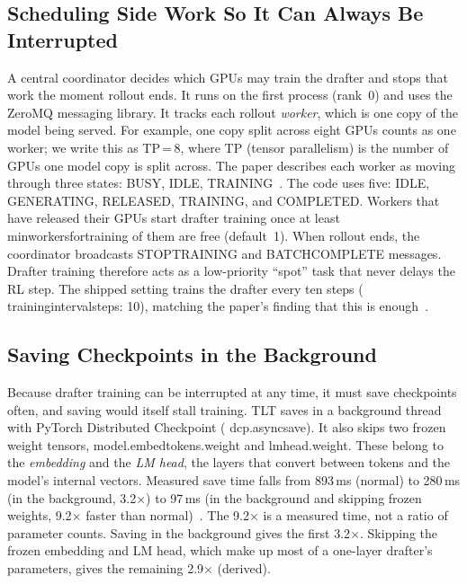 \documentclass[conference]{IEEEtran}
\newcommand{\brkus}{\textunderscore\allowbreak}
\newcommand{\code}[1]{{\small\ttfamily\let\_\brkus\hyphenchar\font=-1 #1}}
\newcommand{\x}{\ensuremath{\times}}
\begin{document}
\subsection{Scheduling Side Work So It Can Always Be Interrupted}
A central coordinator decides which GPUs may train the drafter and stops that work the moment rollout ends. It runs on the first process (rank~0) and uses the ZeroMQ messaging library. It tracks each rollout \emph{worker}, which is one copy of the model being served. For example, one copy split across eight GPUs counts as one worker; we write this as TP\,=\,8, where TP (tensor parallelism) is the number of GPUs one model copy is split across. The paper describes each worker as moving through three states: BUSY, IDLE, TRAINING~\cite[Sec.~4.2]{hu2026tlt}. The code uses five: \code{IDLE}, \code{GENERATING}, \code{RELEASED}, \code{TRAINING}, and \code{COMPLETED}. Workers that have released their GPUs start drafter training once at least \code{min\_workers\_for\_training} of them are free (default~1). When rollout ends, the coordinator broadcasts \code{STOP\_TRAINING} and \code{BATCH\_COMPLETE} messages. Drafter training therefore acts as a low-priority ``spot'' task that never delays the RL step. The shipped setting trains the drafter every ten steps (\code{training\_interval\_steps: 10}), matching the paper's finding that this is enough~\cite[Sec.~6.4]{hu2026tlt}.

\subsection{Saving Checkpoints in the Background}
Because drafter training can be interrupted at any time, it must save checkpoints often, and saving would itself stall training. TLT saves in a background thread with PyTorch Distributed Checkpoint (\code{dcp.async\_save}). It also skips two frozen weight tensors, \code{model.embed\_tokens.weight} and \code{lm\_head.weight}. These belong to the \emph{embedding} and the \emph{LM head}, the layers that convert between tokens and the model's internal vectors. Measured save time falls from 893\,ms (normal) to 280\,ms (in the background, 3.2\x) to 97\,ms (in the background and skipping frozen weights, 9.2\x{} faster than normal)~\cite[Fig.~17a]{hu2026tlt}. The 9.2\x{} is a measured time, not a ratio of parameter counts. Saving in the background gives the first 3.2\x{}. Skipping the frozen embedding and LM head, which make up most of a one-layer drafter's parameters, gives the remaining 2.9\x{} (derived).
\end{document}
